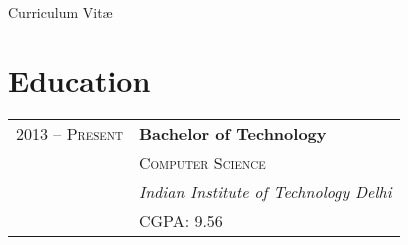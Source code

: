 \documentclass[10pt]{article} %
\begin{document}
\color{text1} %


\par{\\ %
{\color{headings} Curriculum {Vit\ae}\\[15pt]\par} %
	

\begin{minipage}[t]{0.5\textwidth} %
\vspace{0pt} %



\section{Education} 

\begin{tabular}{rl} %


2013 -- \textsc{Present} & \textbf{Bachelor of Technology} \\ 
& \textsc{Computer Science} \\ 
& \textit{Indian Institute of Technology Delhi}\\
& CGPA: 9.56

\end{tabular}\\[10pt]



\end{minipage}}
\end{document}
